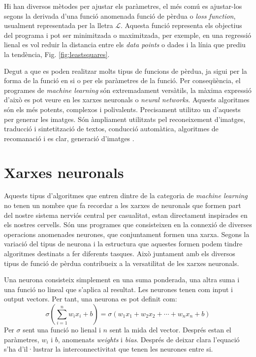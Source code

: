 Hi han diversos mètodes per ajustar els paràmetres, el més comú es ajustar-los segons la derivada d'una funció anomenada funció de pèrdua o \textit{loss function}, usualment representada per la lletra $\mathcal{L}$. Aquesta funció representa els objectius del programa i pot ser minimitzada o maximitzada, per exemple, en una regressió lienal es vol reduir la distancia entre els \textit{data points} o dades i la línia que prediu la tendència, Fig. \ref{fig:leastsquares}. 

Degut a que es poden realitzar molts tipus de funcions de pèrdua, ja sigui per la forma de la funció en si o per els paràmetres de la funció. Per conseqüència, el programes de \textit{machine learning} són extremadament versàtils, la màxima expressió d'això es pot veure en les xarxes neuronals o \textit{neural networks}. Aquests algoritmes són els més potents, complexos i polivalents. Precisament utilitzo un d'aquests per generar les imatges. Són àmpliament utilitzats pel reconeixement d'imatges, traducció i sintetització de textos, conducció automàtica, algoritmes de recomanació i es clar, generació d'imatges \tocite. 

\section{Xarxes neuronals}
Aquests tipus d'algoritmes que entren dintre de la categoria de \textit{machine learning} no tenen un nombre que fa recordar a les xarxes de neuronals que formen part del nostre sistema nerviós central per casualitat, estan directament inspirades en els nostres cervells. Són uns programes que consisteixen en la connexió de diverses operacions anomenades neurones, que conjuntament formen una xarxa. Segons la variació del tipus de neurona i la estructura que aquestes formen podem tindre algoritmes destinats a fer diferents tasques. Això juntament amb els diversos tipus de funció de pèrdua contribueix a la versatilitat de les xarxes neuronals. 

Una neurona consisteix simplement en una suma ponderada, una altra suma i una funció no lineal que s'aplica al resultat. Les neurones tenen com input i output vectors. Per tant, una neurona es pot definit com:
$$
\sigma \left(\sum_{i=1}^n w_i x_i + b\right) = \sigma \left( w_1x_1 + w_2x_2 + \cdots + w_nx_n + b 
\right) 
$$
Per $\sigma$ sent una funció no lienal i $n$ sent la mida del vector. Després estan el paràmetres, $w_i$ i $b$, anomenats \textit{weights} i \textit{bias}. Després de deixar clara l'equació s'ha d'il·lustrar la interconnectivitat que tenen les neurones entre si. 

